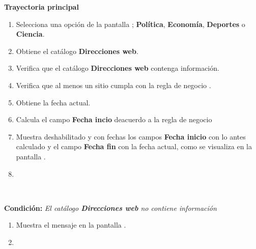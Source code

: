 \begin{large}
	\textbf{Trayectoria principal}\\
\end{large}	

\begin{enumerate}[1.]
	
	\item \actor Selecciona una opción de la pantalla ; \textbf{Política}, \textbf{Economía}, \textbf{Deportes} o \textbf{Ciencia}. 
	
	\item \sistema Obtiene el catálogo \textbf{Direcciones web}.
	
	\item \sistema Verifica que el catálogo \textbf{Direcciones web} contenga información. 
	
	\item \sistema Verifica que al menos un sitio cumpla con la regla de negocio . 

	\item \sistema Obtiene la fecha actual.

	\item \sistema \label{CU1:FechaI}Calcula el campo \textbf{Fecha incio} deacuerdo a la regla de negocio 

	\item \label{CU1:Pantalla}\sistema Muestra deshabilitado y con fechas los campos \textbf{Fecha inicio} con lo antes calculado y el campo \textbf{Fecha fin} con la fecha actual, como se visualiza en la pantalla .
	
	\item \finCU	

\end{enumerate}



\begin{large}
	\\
\end{large}	
\textbf{Condición:} \textit{El catálogo \textbf{Direcciones web} no contiene información}

\begin{enumerate}[{A-}1.]

	\item \sistema Muestra el mensaje  en la pantalla .
	\item \finCU	

\end{enumerate}


